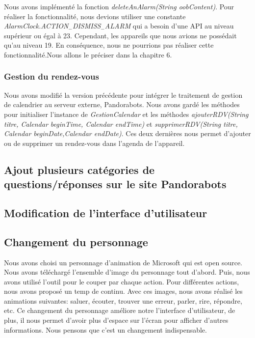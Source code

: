 \indent Nous avons implémenté la fonction \emph{deleteAnAlarm(String oobContent)}. Pour réaliser la fonctionnalité, nous devions utiliser une constante \emph{AlarmClock.ACTION$_-$DISMISS$_-$ALARM} qui a besoin d'une API au niveau supérieur ou égal à 23. Cependant, les appareils que nous avions ne possédait qu'au niveau 19. En conséquence, nous ne pourrions pas réaliser cette fonctionnalité.Nous allons le préciser dans la chapitre 6.\\

\subsubsection{Gestion du rendez-vous}
\indent Nous avons modifié la version précédente pour intégrer le traitement de gestion de calendrier au serveur externe, Pandorabots. Nous avons gardé les méthodes pour initialiser l'instance de \emph{GestionCalendar} et les méthodes \emph{ajouterRDV(String titre, Calendar beginTime, Calendar endTime)} et \emph{supprimerRDV(String titre, Calendar beginDate,Calendar endDate)}. Ces deux dernières nous permet d'ajouter ou de supprimer un rendez-vous dans l'agenda de l'appareil.

\subsection{Ajout plusieurs catégories de questions/réponses sur le site Pandorabots}

\subsection{Modification de l'interface d'utilisateur}


\subsection{Changement du personnage}
\indent Nous avons choisi un personnage d'animation de Microsoft qui est open source. Nous avons téléchargé l'ensemble d'image du personnage tout d'abord. Puis, nous avons utilisé l'outil pour le couper par chaque action. Pour différentes actions, nous avons proposé un temp de continu. Avec ces images, nous avons réalisé les animations  suivantes: saluer, écouter, trouver une  erreur, parler, rire, répondre, etc. Ce changement du personnage améliore notre l'interface d'utilisateur, de plus, il nous permet d'avoir plus d'espace sur l'écran pour afficher d'autres informations. Nous pensons que c'est un changement indispensable.